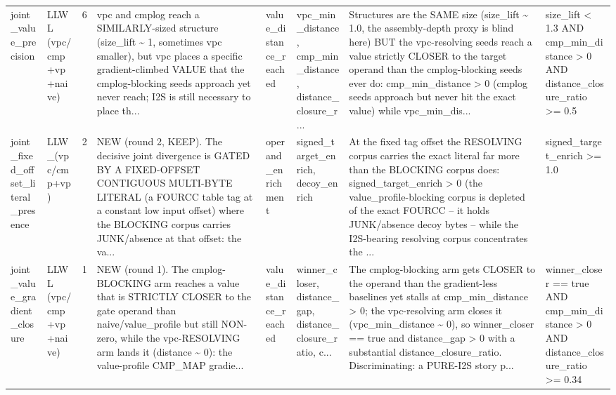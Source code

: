 \documentclass[7pt]{extarticle}
\begin{document}
{\begin{longtable}{@{}p{2.4cm}p{1.9cm}rp{4.3cm}p{1.5cm}p{1.7cm}p{4.6cm}p{3.0cm}@{}}
joint\_\allowbreak value\_\allowbreak precision & LLWL (vpc/cmp+vp+naive) & 6 & vpc and cmplog reach a SIMILARLY-sized structure (size\_\allowbreak lift \textasciitilde{} 1, sometimes vpc smaller), but vpc places a specific gradient-climbed VALUE that the cmplog-blocking seeds approach yet never reach; I2S is still necessary to place th... & value\_\allowbreak distance\_\allowbreak reached & vpc\_\allowbreak min\_\allowbreak distance, cmp\_\allowbreak min\_\allowbreak distance, distance\_\allowbreak closure\_\allowbreak r... & Structures are the SAME size (size\_\allowbreak lift \textasciitilde{} 1.0, the assembly-depth proxy is blind here) BUT the vpc-resolving seeds reach a value strictly CLOSER to the target operand than the cmplog-blocking seeds ever do: cmp\_\allowbreak min\_\allowbreak distance \textgreater{} 0 (cmplog seeds approach but never hit the exact value) while vpc\_\allowbreak min\_\allowbreak dis... & size\_\allowbreak lift \textless{} 1.3 AND cmp\_\allowbreak min\_\allowbreak distance \textgreater{} 0 AND distance\_\allowbreak closure\_\allowbreak ratio \textgreater{}= 0.5\\
joint\_\allowbreak fixed\_\allowbreak offset\_\allowbreak literal\_\allowbreak presence & LLW\_\allowbreak  (vpc/cmp+vp) & 2 & NEW (round 2, KEEP). The decisive joint divergence is GATED BY A FIXED-OFFSET CONTIGUOUS MULTI-BYTE LITERAL (a FOURCC table tag at a constant low input offset) where the BLOCKING corpus carries JUNK/absence at that offset: the va... & operand\_\allowbreak enrichment & signed\_\allowbreak target\_\allowbreak enrich, decoy\_\allowbreak enrich & At the fixed tag offset the RESOLVING corpus carries the exact literal far more than the BLOCKING corpus does: signed\_\allowbreak target\_\allowbreak enrich \textgreater{} 0 (the value\_\allowbreak profile-blocking corpus is depleted of the exact FOURCC -- it holds JUNK/absence decoy bytes -- while the I2S-bearing resolving corpus concentrates the ... & signed\_\allowbreak target\_\allowbreak enrich \textgreater{}= 1.0\\
joint\_\allowbreak value\_\allowbreak gradient\_\allowbreak closure & LLWL (vpc/cmp+vp+naive) & 1 & NEW (round 1). The cmplog-BLOCKING arm reaches a value that is STRICTLY CLOSER to the gate operand than naive/value\_\allowbreak profile but still NON-zero, while the vpc-RESOLVING arm lands it (distance \textasciitilde{} 0): the value-profile CMP\_\allowbreak MAP gradie... & value\_\allowbreak distance\_\allowbreak reached & winner\_\allowbreak closer, distance\_\allowbreak gap, distance\_\allowbreak closure\_\allowbreak ratio, c... & The cmplog-blocking arm gets CLOSER to the operand than the gradient-less baselines yet stalls at cmp\_\allowbreak min\_\allowbreak distance \textgreater{} 0; the vpc-resolving arm closes it (vpc\_\allowbreak min\_\allowbreak distance \textasciitilde{} 0), so winner\_\allowbreak closer == true and distance\_\allowbreak gap \textgreater{} 0 with a substantial distance\_\allowbreak closure\_\allowbreak ratio. Discriminating: a PURE-I2S story p... & winner\_\allowbreak closer == true AND cmp\_\allowbreak min\_\allowbreak distance \textgreater{} 0 AND distance\_\allowbreak closure\_\allowbreak ratio \textgreater{}= 0.34\\

\end{longtable}}
\end{document}
